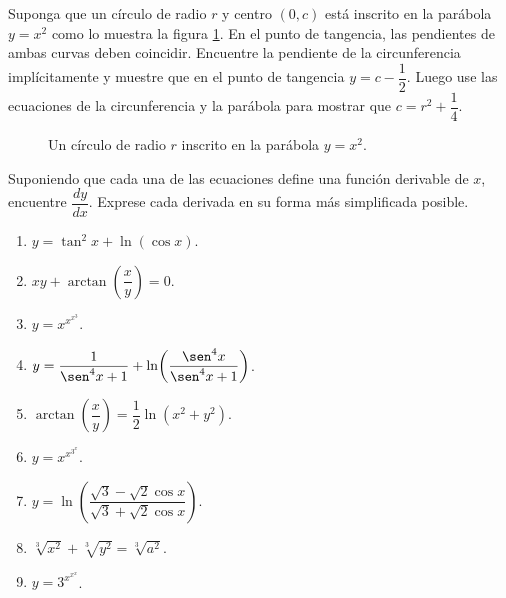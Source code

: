 \begin{prob}
Suponga que un círculo de radio $r$ y centro $(0, c)$ está inscrito en
la parábola $y = x^2$ como lo muestra la figura \ref{circder}. En el punto
de tangencia, las pendientes de ambas curvas deben coincidir. Encuentre
la pendiente de la circunferencia implícitamente y muestre que en el
punto de tangencia $y = c - \dfrac{1}{2}$. Luego use las ecuaciones
de la circunferencia y la parábola para mostrar que
$c = r^2 + \dfrac{1}{4}$.

\begin{figure}[!htbp]
\centering


\caption{Un círculo de radio $r$ inscrito en la parábola $y = x^2$.}
\label{circder}
\end{figure}
\end{prob}

\begin{prob}
Suponiendo que cada una de las ecuaciones define una función derivable
de $x$, encuentre $\dfrac{dy}{dx}$. Exprese cada derivada en su forma
más simplificada posible.
\begin{enumerate}
    \item $y = \tan^2 x + \ln(\cos x)$.
    \item $xy + \arctan\!\left(\dfrac{x}{y}\right) = 0$.
    \item $y = x^{x^{x^3}}$.
    \item $y = \dfrac{1}{\sen^4 x+1}
          +\ln\!\left(\dfrac{\sen^4 x}{\sen^4 x+1}\right)$.
    \item $\arctan\!\left(\dfrac{x}{y}\right)
          = \dfrac{1}{2}\ln(x^2+y^2)$.
    \item $y = x^{x^{3^x}}$.
    \item $y = \ln\!\left(\dfrac{\sqrt{3}-\sqrt{2}\cos x}
          {\sqrt{3}+\sqrt{2}\cos x}\right)$.
    \item $\sqrt[3]{x^2}+\sqrt[3]{y^2}=\sqrt[3]{a^2}$.
    \item $y = 3^{x^{x^x}}$.
\end{enumerate}
\end{prob}

